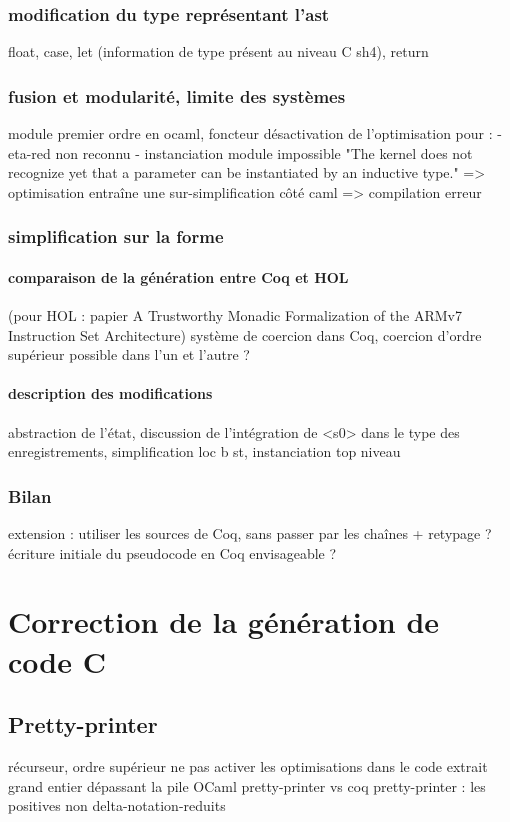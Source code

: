 \documentclass[a4paper, 11pt]{article}
\begin{document}
    \subsubsection{modification du type représentant l'ast} 
    float, case, let (information de type présent au niveau C sh4), return
    \subsubsection{fusion et modularité, limite des systèmes}
    module premier ordre en ocaml, foncteur
    désactivation de l'optimisation pour :
      - eta-red non reconnu
      - instanciation module impossible "The kernel does not recognize yet that a parameter can be instantiated by an inductive type." => optimisation entraîne une sur-simplification côté caml => compilation erreur 
      
    \subsubsection{simplification sur la forme}
      \paragraph{comparaison de la génération entre Coq et HOL}
      (pour HOL : papier A Trustworthy Monadic Formalization of the
ARMv7 Instruction Set Architecture)
      système de coercion dans Coq, coercion d'ordre supérieur possible dans l'un et l'autre ?
      \paragraph{description des modifications}
      abstraction de l'état, 
      discussion de l'intégration de <s0> dans le type des enregistrements,
      simplification {loc b st}, instanciation top niveau
    \subsubsection{Bilan}
    extension : utiliser les sources de Coq, sans passer par les chaînes + retypage ?
    écriture initiale du pseudocode en Coq envisageable ?

\section{Correction de la génération de code C}
\subsection{Pretty-printer}
récurseur, ordre supérieur
ne pas activer les optimisations dans le code extrait
grand entier dépassant la pile OCaml
pretty-printer vs coq pretty-printer : les positives non delta-notation-reduits
\end{document}
